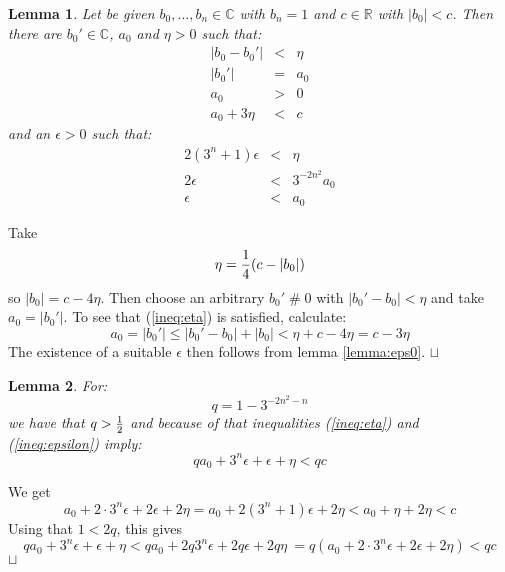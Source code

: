 \documentclass{article}
\def\RR{\mathbb{R}}
\def\CC{\mathbb{C}}
\newtheorem{lemma}{Lemma}
\newenvironment{proof}{\trivlist \item[\hskip \labelsep{\bf Proof$\,$}]}{\hfill\rlap{$\sqcap$}$\sqcup$\par}
\begin{document}
\begin{lemma}\label{lemma:eps}
Let be given $b_0,\ldots,b_n\in\CC$ with $b_n = 1$ and $c\in\RR$ with $|b_0| < c$.
Then there are $b_0'\in\CC$, $a_0$ and $\eta > 0$ such that:
\begin{eqnarray}
|b_0 - b_0'| &<& \eta\\
|b_0'| &=& a_0\\
a_0 &>& 0\\
a_0 + 3\eta &<& c  \label{ineq:eta}
\end{eqnarray}
and an $\epsilon > 0$ such that:
\begin{eqnarray}
2(3^n + 1)\epsilon &<& \eta  \label{ineq:epsilon}\\
2\epsilon &<& 3^{-2n^2} a_0\\
\epsilon &<& a_0
\end{eqnarray}
\end{lemma}
\begin{proof}
Take
$$\eta = {1\over 4}(c - |b_0|)$$
so $|b_0| = c - 4\eta$.
Then choose an arbitrary $b_0' \mathrel{\#} 0$ with $|b_0' - b_0| < \eta$ and take $a_0 = |b_0'|$.
To see that (\ref{ineq:eta}) is satisfied, calculate:
$$a_0 = |b_0'| \le |b_0' - b_0| + |b_0| < \eta + c - 4\eta = c - 3\eta$$
%
The existence of a suitable $\epsilon$ then follows from lemma \ref{lemma:eps0}.
\end{proof}

\begin{lemma}\label{lemma:eps1}
For:
$$q = 1 - 3^{-2n^2-n}$$
we have that $q > {1\over 2}$ and because of that
inequalities (\ref{ineq:eta}) and (\ref{ineq:epsilon}) imply:
$$q a_0 + 3^n \epsilon + \epsilon + \eta < qc$$
\end{lemma}
\begin{proof}
We get
$$a_0 + 2\cdot 3^n\epsilon + 2\epsilon + 2\eta = a_0 + 2(3^n + 1)\epsilon + 2\eta < a_0 + \eta + 2\eta < c$$
Using that $1 < 2q$, this gives
$$q a_0 + 3^n\epsilon + \epsilon + \eta < q a_0 + 2q 3^n\epsilon + 2q \epsilon + 2q \eta\
= q (a_0 + 2\cdot 3^n\epsilon + 2\epsilon + 2\eta) < qc $$
\end{proof}
\end{document}
